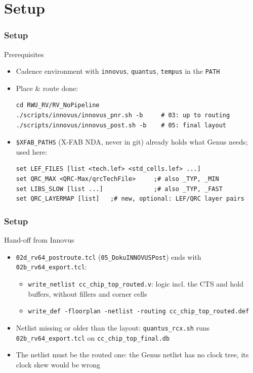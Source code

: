 \documentclass{beamer}
\newcommand{\astitle}{nix}
\newcommand{\assubtitle}{nix}
\newcommand{\cmd}[1]{\texttt{#1}}
\begin{document}
\section{Setup}
\renewcommand{\astitle}{Setup}

\renewcommand{\assubtitle}{Prerequisites}
\begin{frame}[fragile]
\frametitle{\astitle}
\begin{block}{\assubtitle}
  \begin{itemize}
    \item Cadence environment with \cmd{innovus}, \cmd{quantus},
      \cmd{tempus} in the \cmd{PATH}
    \item Place \& route done:
\begin{lstlisting}[style=sh]
cd RWU_RV/RV_NoPipeline
./scripts/innovus/innovus_pnr.sh -b     # 03: up to routing
./scripts/innovus/innovus_post.sh -b    # 05: final layout
\end{lstlisting}
    \item \cmd{\$XFAB\_PATHS} (X-FAB NDA, never in git) already holds what
      Genus needs; used here:
\begin{lstlisting}[style=sh]
set LEF_FILES [list <tech.lef> <std_cells.lef> ...]
set QRC_MAX <QRC-Max/qrcTechFile>     ;# also _TYP, _MIN
set LIBS_SLOW [list ...]              ;# also _TYP, _FAST
set QRC_LAYERMAP [list]   ;# new, optional: LEF/QRC layer pairs
\end{lstlisting}
  \end{itemize}
\end{block}
\end{frame}

\renewcommand{\assubtitle}{Hand-off from Innovus}
\begin{frame}
\frametitle{\astitle}
\begin{block}{\assubtitle}
  \begin{itemize}
    \item \cmd{02d\_rv64\_postroute.tcl} (\cmd{05\_DokuINNOVUSPost}) ends
      with \cmd{02b\_rv64\_export.tcl}:
    \begin{itemize}
      \item \cmd{write\_netlist cc\_chip\_top\_routed.v}: logic incl. the
        CTS and hold buffers, without fillers and corner cells
      \item \cmd{write\_def -floorplan -netlist -routing
        cc\_chip\_top\_routed.def}
    \end{itemize}
    \item Netlist missing or older than the layout:
      \cmd{quantus\_rcx.sh} runs \cmd{02b\_rv64\_export.tcl} on
      \cmd{cc\_chip\_top\_final.db}
    \item The netlist must be the routed one: the Genus netlist has no
      clock tree, its clock skew would be wrong
  \end{itemize}
\end{block}
\end{frame}
\end{document}
